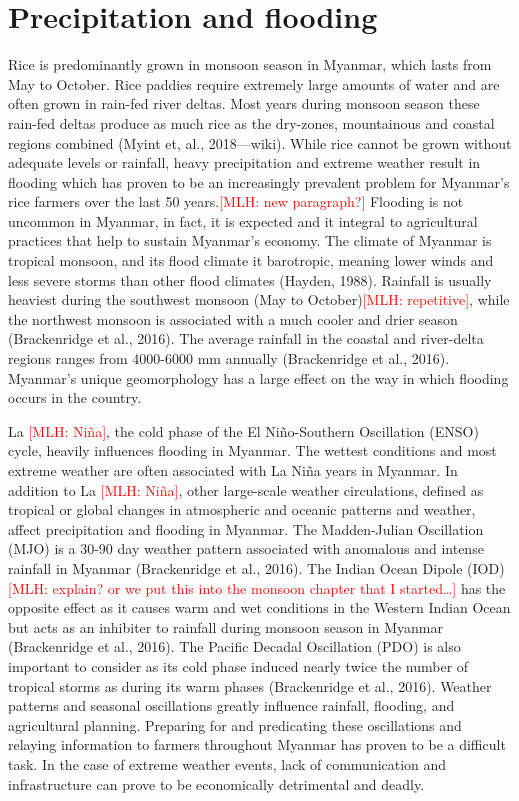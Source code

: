 \documentclass{book}\usepackage{knitr}
\newcommand{\red}[1]{\textcolor{red}{[MLH: #1]}}
\begin{document}
{\section{Precipitation and flooding}

Rice is predominantly grown in monsoon season in Myanmar, which lasts from May to October. Rice paddies require extremely large amounts of water and are often grown in rain-fed river deltas. Most years during monsoon season these rain-fed deltas produce as much rice as the dry-zones, mountainous and coastal regions combined (Myint et, al., 2018—wiki). While rice cannot be grown without adequate levels or rainfall, heavy precipitation and extreme weather result in flooding which has proven to be an increasingly prevalent problem for Myanmar’s rice farmers over the last 50 years.\red{new paragraph?}
	Flooding is not uncommon in Myanmar, in fact, it is expected and it integral to agricultural practices that help to sustain Myanmar’s economy. The climate of Myanmar is tropical monsoon, and its flood climate it barotropic, meaning lower winds and less severe storms than other flood climates (Hayden, 1988). Rainfall is usually heaviest during the southwest monsoon (May to October)\red{repetitive}, while the northwest monsoon is associated with a much cooler and drier season (Brackenridge et al., 2016). The average rainfall in the coastal and river-delta regions ranges from 4000-6000 mm annually (Brackenridge et al., 2016). 
	Myanmar’s unique geomorphology has a large effect on the way in which flooding occurs in the country. 
	
La \red{Niña}, the cold phase of the El Niño-Southern Oscillation (ENSO) cycle, heavily influences flooding in Myanmar. The wettest conditions and most extreme weather are often associated with La Niña years in Myanmar. In addition to La \red{Niña}, other large-scale weather circulations, defined as tropical or global changes in atmospheric and oceanic patterns and weather, affect precipitation and flooding in Myanmar. The Madden-Julian Oscillation (MJO) is a 30-90 day weather pattern associated with anomalous and intense rainfall in Myanmar (Brackenridge et al., 2016).  The Indian Ocean Dipole (IOD)\red{explain? or we put this into the monsoon chapter that I started\ldots} has the opposite effect as it causes warm and wet conditions in the Western Indian Ocean but acts as an inhibiter to rainfall during monsoon season in Myanmar (Brackenridge et al., 2016). The Pacific Decadal Oscillation (PDO) is also important to consider as its cold phase induced nearly twice the number of tropical storms as during its warm phases (Brackenridge et al., 2016). Weather patterns and seasonal oscillations greatly influence rainfall, flooding, and agricultural planning. Preparing for and predicating these oscillations and relaying information to farmers throughout Myanmar has proven to be a difficult task. In the case of extreme weather events, lack of communication and infrastructure can prove to be economically detrimental and deadly. 


}
\end{document}
